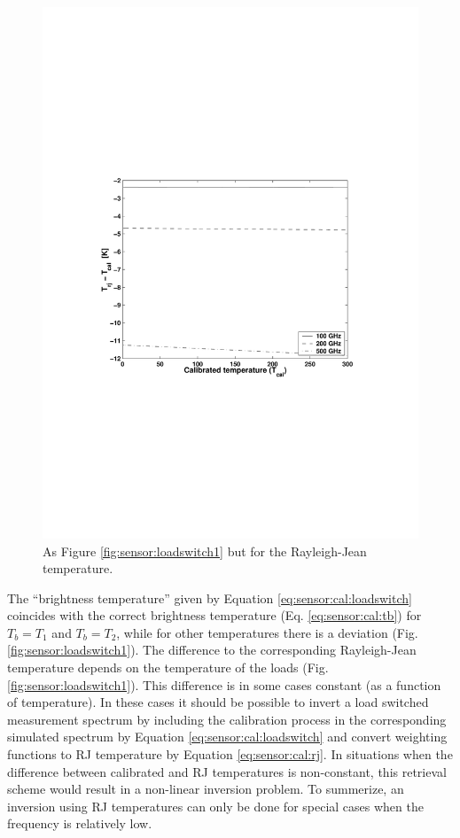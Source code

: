 \begin{figure}[t]
\begin{center}
\begin{minipage}{0.50\textwidth}
    \includegraphics*[width=0.99\hsize]{Figs/fig_calerror_trj_2}
   \end{minipage}
  \end{center}
    \caption{As Figure \ref{fig:sensor:loadswitch1} but for the Rayleigh-Jean
             temperature.}
    \label{fig:sensor:loadswitch2}
 \end{figure}           
  
 The ``brightness temperature'' given by Equation
 \ref{eq:sensor:cal:loadswitch} coincides with the correct brightness
 temperature (Eq. \ref{eq:sensor:cal:tb}) for $T_b=T_1$ and $T_b=T_2$,
 while for other temperatures there is a deviation (Fig.
 \ref{fig:sensor:loadswitch1}). The difference to the corresponding
 Rayleigh-Jean temperature depends on the temperature of the loads
 (Fig. \ref{fig:sensor:loadswitch1}). This difference is in some cases
 constant (as a function of temperature). In these cases it should be
 possible to invert a load switched measurement spectrum by including
 the calibration process in the corresponding simulated spectrum by
 Equation \ref{eq:sensor:cal:loadswitch} and convert weighting
 functions to RJ temperature by Equation \ref{eq:sensor:cal:rj}. In
 situations when the difference between calibrated and RJ temperatures
 is non-constant, this retrieval scheme would result in a non-linear
 inversion problem. To summerize, an inversion using RJ temperatures
 can only be done for special cases when the frequency is relatively
 low.
  
